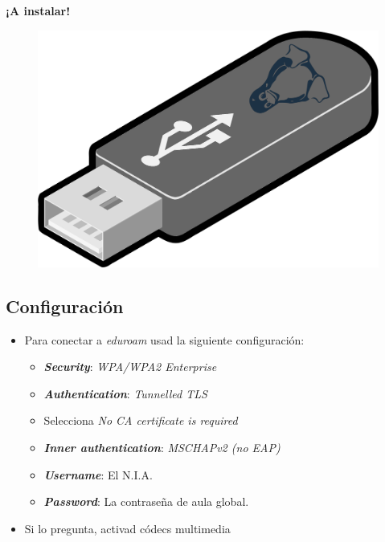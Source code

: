 \documentclass[aspectratio=43]{beamer}
\begin{document}
    \begin{frame}[fragile]{}{}
        \begin{center}
            \huge{\textbf{¡A instalar!}}
            \bigskip
            \begin{figure}
                \centering
                \includegraphics[width=.4\textwidth]{img/usb.png}
            \end{figure}
        \end{center}
    \end{frame}

    \subsection{Configuración}
     \begin{frame}{\subsecname}{}
        \begin{itemize}
            \item Para conectar a \textit{eduroam} usad la siguiente configuración:
            \begin{itemize}
                \item \textbf{\textit{Security}}: \textit{WPA/WPA2 Enterprise}
                \item \textbf{\textit{Authentication}}: \textit{Tunnelled TLS}
                \item Selecciona \textit{No CA certificate is required}
                \item \textbf{\textit{Inner authentication}}: \textit{MSCHAPv2 (no EAP)}
                \item \textbf{\textit{Username}}: El N.I.A.
                \item \textbf{\textit{Password}}: La contraseña de aula global.
            \end{itemize}
            \item Si lo pregunta, activad códecs multimedia
        \end{itemize}
    \end{frame}
\end{document}
